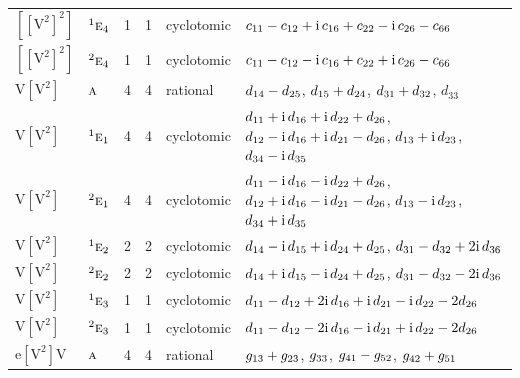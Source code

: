 \documentclass[10pt,a4paper]{article}
\numberwithin{equation}{section}
\newcommand{\irr}[1]{\text{\normalfont\scshape #1}}
\newcommand{\conjpair}[1]{{}^{#1}}
\newcommand{\iunit}{\mathrm{i}}
\newcommand{\jahn}[1]{\mathrm{#1}}
\newlength{\fillwidth}\newlength{\cellwidth}\newlength{\colwidth}
\newcommand{\signbreak}{\penalty100\relax}
\begin{document}
{\begin{longtable}{@{}llrrl>{\RaggedRight\arraybackslash}p{\fillwidth}@{}}
$\jahn{[[V^{2}]^{2}]}$ & $\conjpair{1}\irr{e}_{4}$ & 1 & 1 & cyclotomic & $c_{11} -\signbreak c_{12} +\signbreak \iunit{}\,c_{16} +\signbreak c_{22} -\signbreak \iunit{}\,c_{26} -\signbreak c_{66}$\\
$\jahn{[[V^{2}]^{2}]}$ & $\conjpair{2}\irr{e}_{4}$ & 1 & 1 & cyclotomic & $c_{11} -\signbreak c_{12} -\signbreak \iunit{}\,c_{16} +\signbreak c_{22} +\signbreak \iunit{}\,c_{26} -\signbreak c_{66}$\\
$\jahn{V[V^{2}]}$ & $\irr{a}$ & 4 & 4 & rational & $d_{14} -\signbreak d_{25}$, $d_{15} +\signbreak d_{24}$, $d_{31} +\signbreak d_{32}$, $d_{33}$\\
$\jahn{V[V^{2}]}$ & $\conjpair{1}\irr{e}_{1}$ & 4 & 4 & cyclotomic & $d_{11} +\signbreak \iunit{}\,d_{16} +\signbreak \iunit{}\,d_{22} +\signbreak d_{26}$, $d_{12} -\signbreak \iunit{}\,d_{16} +\signbreak \iunit{}\,d_{21} -\signbreak d_{26}$, $d_{13} +\signbreak \iunit{}\,d_{23}$, $d_{34} -\signbreak \iunit{}\,d_{35}$\\
$\jahn{V[V^{2}]}$ & $\conjpair{2}\irr{e}_{1}$ & 4 & 4 & cyclotomic & $d_{11} -\signbreak \iunit{}\,d_{16} -\signbreak \iunit{}\,d_{22} +\signbreak d_{26}$, $d_{12} +\signbreak \iunit{}\,d_{16} -\signbreak \iunit{}\,d_{21} -\signbreak d_{26}$, $d_{13} -\signbreak \iunit{}\,d_{23}$, $d_{34} +\signbreak \iunit{}\,d_{35}$\\
$\jahn{V[V^{2}]}$ & $\conjpair{1}\irr{e}_{2}$ & 2 & 2 & cyclotomic & $d_{14} -\signbreak \iunit{}\,d_{15} +\signbreak \iunit{}\,d_{24} +\signbreak d_{25}$, $d_{31} -\signbreak d_{32} +\signbreak 2\iunit{}\,d_{36}$\\
$\jahn{V[V^{2}]}$ & $\conjpair{2}\irr{e}_{2}$ & 2 & 2 & cyclotomic & $d_{14} +\signbreak \iunit{}\,d_{15} -\signbreak \iunit{}\,d_{24} +\signbreak d_{25}$, $d_{31} -\signbreak d_{32} -\signbreak 2\iunit{}\,d_{36}$\\
$\jahn{V[V^{2}]}$ & $\conjpair{1}\irr{e}_{3}$ & 1 & 1 & cyclotomic & $d_{11} -\signbreak d_{12} +\signbreak 2\iunit{}\,d_{16} +\signbreak \iunit{}\,d_{21} -\signbreak \iunit{}\,d_{22} -\signbreak 2d_{26}$\\
$\jahn{V[V^{2}]}$ & $\conjpair{2}\irr{e}_{3}$ & 1 & 1 & cyclotomic & $d_{11} -\signbreak d_{12} -\signbreak 2\iunit{}\,d_{16} -\signbreak \iunit{}\,d_{21} +\signbreak \iunit{}\,d_{22} -\signbreak 2d_{26}$\\
$\jahn{e[V^{2}]V}$ & $\irr{a}$ & 4 & 4 & rational & $\mathnormal{g}_{13} +\signbreak \mathnormal{g}_{23}$, $\mathnormal{g}_{33}$, $\mathnormal{g}_{41} -\signbreak \mathnormal{g}_{52}$, $\mathnormal{g}_{42} +\signbreak \mathnormal{g}_{51}$\\

\end{longtable}}
\end{document}
